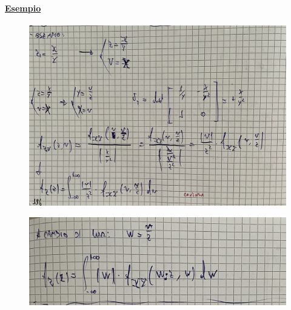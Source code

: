 \documentclass{article}
\begin{document}
\paragraph{\underline{Esempio}}
\begin{figure}[ht]
\centering
\includegraphics[scale=0.16]{ese/50.jpeg}
\end{figure} 
\begin{figure}[ht]
\centering
\includegraphics[scale=0.16]{ese/50a.jpeg}
\end{figure} 
\end{document}
